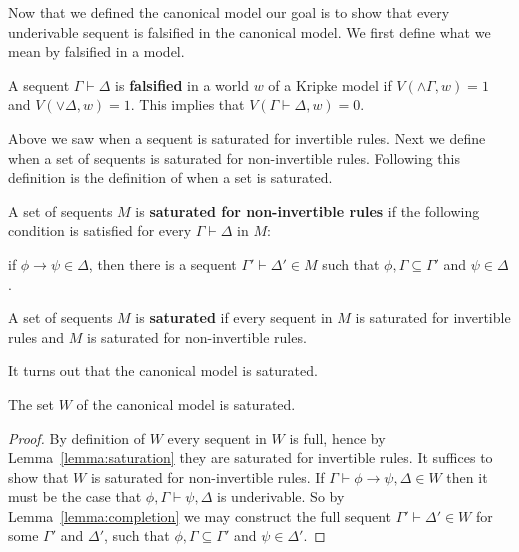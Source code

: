 \documentclass{article}
\begin{document}
Now that we defined the canonical model our goal is to show that every underivable sequent is falsified
in the canonical model. We first define what we mean by falsified in a model.
\begin{definition}
  \label{def:Falsification}
  A sequent $\Gamma \vdash \Delta$ is \textbf{falsified} in a world $w$ of a Kripke model if
  $V(\land \Gamma,w) = 1$ and $V(\lor \Delta, w) = 1$.  This implies that $V(\Gamma \vdash \Delta, w) = 0$.
\end{definition}

Above we saw when a sequent is saturated for invertible rules.  Next we define when a set of sequents 
is saturated for non-invertible rules. Following this definition is the definition of when a set is
saturated.
\begin{definition}
  \label{def:sat_non-invert_rules}
  A set of sequents $M$ is \textbf{saturated for non-invertible rules} if the
  following condition is satisfied for every $\Gamma \vdash \Delta$
  in $M$:
  \begin{center}
    if $\phi \to \psi \in \Delta$, then there is a sequent $\Gamma' \vdash \Delta' \in M$ such that
    $\phi,\Gamma \subseteq \Gamma'$ and $\psi \in \Delta$.
  \end{center}
\end{definition}

\begin{definition}
  \label{def:sat_set}
  A set of sequents $M$ is \textbf{saturated} if every sequent in $M$ is saturated for invertible rules
  and $M$ is saturated for non-invertible rules.
\end{definition}

\noindent
It turns out that the canonical model is saturated.  

\begin{lemma}
  \label{lemma:canonical_model_is_saturated}
  The set $W$ of the canonical model is saturated.
\end{lemma}
\begin{proof}
  By definition of $W$ every sequent in $W$ is full, hence by Lemma~\ref{lemma:saturation} they are 
  saturated for invertible rules.  It suffices to show that $W$ is saturated for non-invertible rules.
  If $\Gamma \vdash \phi \to \psi,\Delta \in W$ then it must be the case that $\phi,\Gamma \vdash \psi,\Delta$
  is underivable.  So by Lemma~\ref{lemma:completion} we may construct the full sequent 
  $\Gamma' \vdash \Delta' \in W$  for some $\Gamma'$ and $\Delta'$, such that $\phi,\Gamma \subseteq \Gamma'$ and 
  $\psi \in \Delta'$.
\end{proof}
\end{document}
